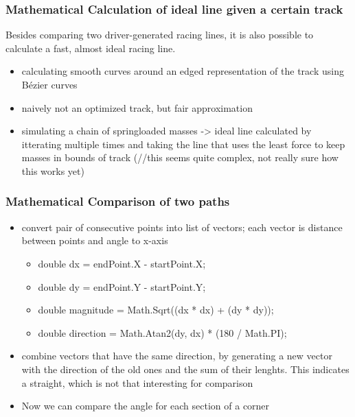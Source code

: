 \subsubsection{Mathematical Calculation of ideal line given a certain track}
Besides comparing two driver-generated racing lines, it is also possible to calculate a fast, almost ideal racing line.
\begin{itemize}
  \item calculating smooth curves around an edged representation of the track using Bézier curves
  \item naively not an optimized track, but fair approximation
  \item simulating a chain of springloaded masses -> ideal line calculated by itterating multiple times and taking the line that uses the least force to keep masses in bounds of track (//this seems quite complex, not really sure how this works yet)
\end{itemize}

\subsubsection{Mathematical Comparison of two paths}
\begin{itemize}
  \item convert pair of consecutive points into list of vectors; each vector is distance between points and angle to x-axis
  \begin{itemize}
    \item double dx = endPoint.X - startPoint.X;
    \item double dy = endPoint.Y - startPoint.Y;
    \item double magnitude = Math.Sqrt((dx * dx) + (dy * dy));
    \item double direction = Math.Atan2(dy, dx) * (180 / Math.PI);
  \end{itemize}
  \item combine vectors that have the same direction, by generating a new vector with the direction of the old ones and the sum of their lenghts. This indicates a straight, which is not that interesting for comparison
  \item Now we can compare the angle for each section of a corner
\end{itemize}
\clearpage
